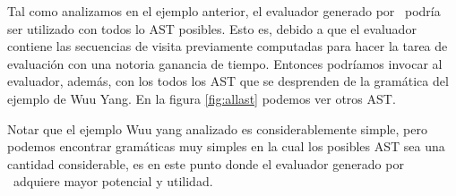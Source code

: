 Tal como analizamos en el ejemplo anterior, el evaluador generado por \maggen\ podría ser utilizado con todos lo AST posibles. Esto es, debido a que el evaluador contiene las secuencias de visita previamente computadas para hacer la tarea de evaluación con una notoria ganancia de tiempo. Entonces podríamos invocar al evaluador, además, con los todos los AST que se desprenden de la gramática del ejemplo de Wuu Yang. En la figura \ref{fig:allast} podemos ver otros AST.

Notar que el ejemplo Wuu yang analizado es considerablemente simple, pero podemos encontrar gramáticas muy simples en la cual los posibles AST sea una cantidad considerable, es en este punto donde el evaluador generado por \maggen\ adquiere mayor potencial y utilidad.

